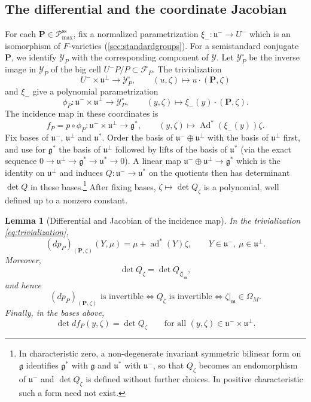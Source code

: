\documentclass[11pt,reqno]{amsart}
\numberwithin{equation}{section}
\theoremstyle{plain}
\newtheorem{lemma}[theorem]{Lemma}
\theoremstyle{definition}
\theoremstyle{remark}
\theoremstyle{plain}
\newcommand{\bG}{\mathbf{G}}     %
\newcommand{\bP}{\mathbf{P}}     %
\newcommand{\g}{\mathfrak{g}}    %
\newcommand{\gd}{\mathfrak{g}^*} %
\newcommand{\uu}{\mathfrak{u}}   %
\newcommand{\m}{\mathfrak{m}}    %
\newcommand{\Pcss}{\mathscr{P}^{\mathrm{ss}}_{\mathrm{max}}}  %
\newcommand{\Fl}{\mathcal{F}}    %
\newcommand{\bFl}{\boldsymbol{\Fl}}  %
\DeclareMathOperator{\Ad}{Ad}
\DeclareMathOperator{\ad}{ad}
\newcommand{\nf}{\zeta}
\newcommand{\Inc}{\mathcal{Y}}
\newcommand{\Incc}[1]{\Inc^{\circ}_{#1}}  %
\begin{document}
\subsection{The differential and the coordinate Jacobian}\label{sec:incidencejacobian}
For each $\bP\in\Pcss$, fix a normalized parametrization
$\xi_-:\uu^-\to U^-$ which is an isomorphism of $F$-varieties (\cref{sec:standardgroups}).
For a semistandard conjugate $\bP$, we identify $\Inc_P$ with the
corresponding component of $\Inc$. Let $\Incc{P}$ be the inverse image
in $\Inc_P$ of the big cell
$U^-P/P\subset\Fl_P$. The trivialization
\begin{equation}\label{eq:trivialization}
U^-\times\uu^\perp\longrightarrow\Incc{P},\qquad
(u,\nf)\longmapsto u\cdot(\bP,\nf)
\end{equation}
and $\xi_-$ give a polynomial parametrization
\begin{equation}\label{eq:bigcellchart}
\phi_P:\uu^-\times\uu^\perp\longrightarrow\Incc{P},\qquad
(y,\nf)\longmapsto\xi_-(y)\cdot(\bP,\nf).
\end{equation}
The incidence map in these coordinates is
\[
f_P=p\circ\phi_P:\uu^-\times\uu^\perp\longrightarrow\gd,\qquad
(y,\nf)\longmapsto\Ad^*(\xi_-(y))\nf.
\]
Fix bases of $\uu^-$, $\uu^\perp$ and $\uu^*$. Order the basis of
$\uu^-\oplus\uu^\perp$ with the basis of $\uu^\perp$ first, and use for $\gd$
the basis of $\uu^\perp$ followed by lifts of the basis of $\uu^*$ (via the
exact sequence $0\to\uu^\perp\to\gd\to\uu^*\to0$). A linear map
$\uu^-\oplus\uu^\perp\to\gd$ which is the identity on $\uu^\perp$ and induces
$Q:\uu^-\to\uu^*$ on the quotients then has determinant $\det Q$ in these
bases.\footnote{In characteristic zero, a
non-degenerate invariant symmetric bilinear form on $\g$ identifies $\gd$
with $\g$ and $\uu^*$ with $\uu^-$, so that $Q_\nf$ becomes an endomorphism
of $\uu^-$ and $\det Q_\nf$ is defined without further choices. In positive
characteristic such a form need not exist.} After fixing bases,
$\nf\mapsto\det Q_\nf$ is a polynomial, well defined up to a nonzero constant.

\begin{lemma}[Differential and Jacobian of the incidence map]\label{lem:levi}
In the trivialization \eqref{eq:trivialization},
\begin{equation}\label{eq:dp}
(dp_P)_{(\bP,\nf)}(Y,\mu)=\mu+\ad^*(Y)\nf,
\qquad Y\in\uu^-,\ \mu\in\uu^\perp.
\end{equation}
Moreover,
\begin{equation}\label{eq:jacobianfiber}
\det Q_\nf=\det Q_{\nf|_\m},
\end{equation}
and hence
\begin{equation}\label{eq:levi}
(dp_P)_{(\bP,\nf)}\text{ is invertible}
\iff Q_\nf\text{ is invertible}\iff\nf|_\m\in\Omega_M.
\end{equation}
Finally, in the bases above,
\begin{equation}\label{eq:detfield}
\det df_P(y,\nf)=\det Q_\nf\qquad\text{for all }(y,\nf)\in\uu^-\times\uu^\perp.
\end{equation}
\end{lemma}
\end{document}
